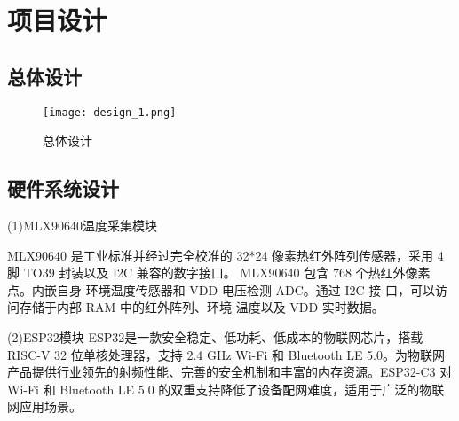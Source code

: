 \chapter{项目设计}
\section{总体设计}
\begin{figure}[htbp]
    \centering
    \texttt{[image: design\_1.png]}
    \caption{总体设计}\label{fig:design_1}
    \vspace{\baselineskip}
    \end{figure}


\section{硬件系统设计}
(1)MLX90640温度采集模块

MLX90640 是工业标准并经过完全校准的 32*24
像素热红外阵列传感器，采用 4 脚 TO39 封装以及
I2C 兼容的数字接口。
MLX90640 包含 768 个热红外像素点。内嵌自身
环境温度传感器和 VDD 电压检测 ADC。通过 I2C 接
口，可以访问存储于内部 RAM 中的红外阵列、环境
温度以及 VDD 实时数据。

(2)ESP32模块
ESP32是一款安全稳定、低功耗、低成本的物联网芯片，搭载 RISC-V 32 位单核处理器，支持 2.4 GHz Wi-Fi 和 Bluetooth LE 5.0。为物联网产品提供行业领先的射频性能、完善的安全机制和丰富的内存资源。ESP32-C3 对 Wi-Fi 和 Bluetooth LE 5.0 的双重支持降低了设备配网难度，适用于广泛的物联网应用场景。

